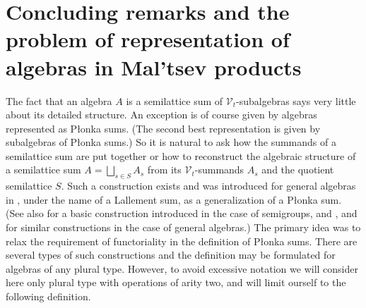 \documentclass{birkau}
\newcommand{\mcV}{\mathcal{V}}
\theoremstyle{plain}
\theoremstyle{definition}
\numberwithin{equation}{section}
\begin{document}
\section{Concluding remarks and the problem of representation of algebras in Mal'tsev products}

The fact that an algebra $A$ is a semilattice sum of $\mcV_t$-subalgebras says very little
about its detailed structure. An exception is of course given by algebras represented as
P\l onka sums. (The second best representation is given by subalgebras of P\l onka sums.)
So it is natural to ask how the summands of a semilattice sum are put together or how to
reconstruct the algebraic structure of a semilattice sum $A = \bigsqcup_{s \in S} A_s$
from its $\mcV_t$-summands $A_s$ and the quotient semilattice $S$. Such a construction
exists and was introduced for general algebras in \cite[\S6.2]{RS85}, under the name of a
Lallement sum, as a generalization of a P\l onka sum. (See also \cite{L67} for a basic
construction introduced in the case of semigroups, and \cite{R86}, \cite{PR92} and
\cite[Ch.~4]{RS02} for similar constructions in the case of general algebras.) The primary
idea was to relax the \mbox{requirement} of functoriality in the definition of P\l onka
sums. There are several types of such constructions and the definition may be formulated
for algebras of any plural type. However, to avoid excessive notation we will consider
here only plural type with operations of arity two, and will limit ourself to the
following definition.
\end{document}

